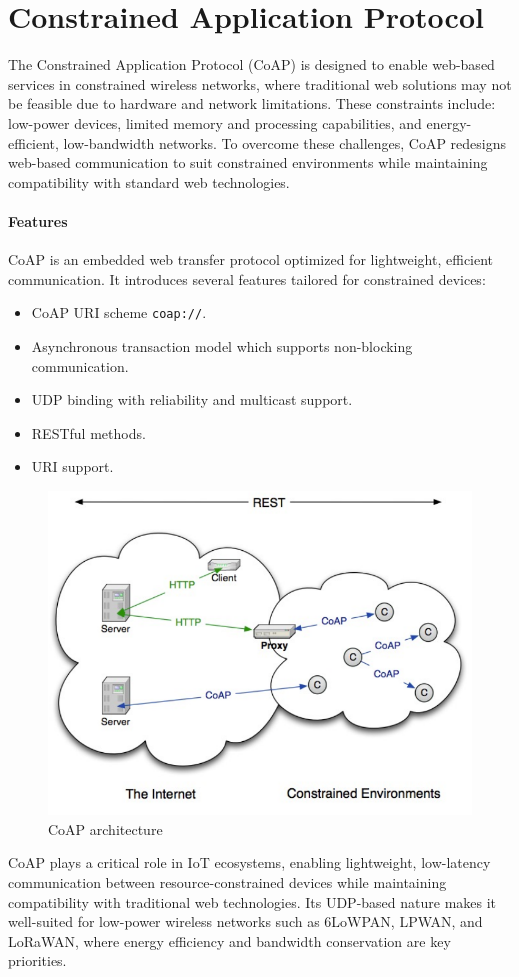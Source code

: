 \section{Constrained Application Protocol}

The Constrained Application Protocol (CoAP) is designed to enable web-based services in constrained wireless networks, where traditional web solutions may not be feasible due to hardware and network limitations. 
These constraints include: low-power devices, limited memory and processing capabilities, and energy-efficient, low-bandwidth networks. 
To overcome these challenges, CoAP redesigns web-based communication to suit constrained environments while maintaining compatibility with standard web technologies.

\paragraph*{Features}
CoAP is an embedded web transfer protocol optimized for lightweight, efficient communication. 
It introduces several features tailored for constrained devices:
\begin{itemize}
    \item CoAP URI scheme \texttt{coap://}. 
    \item Asynchronous transaction model which supports non-blocking communication. 
    \item UDP binding with reliability and multicast support. 
    \item RESTful methods. 
    \item URI support. 
\end{itemize}
\begin{figure}[H]
    \centering
    \includegraphics[width=0.5\linewidth]{images/coap.png}
    \caption{CoAP architecture}
\end{figure}
CoAP plays a critical role in IoT ecosystems, enabling lightweight, low-latency communication between resource-constrained devices while maintaining compatibility with traditional web technologies. 
Its UDP-based nature makes it well-suited for low-power wireless networks such as 6LoWPAN, LPWAN, and LoRaWAN, where energy efficiency and bandwidth conservation are key priorities.

